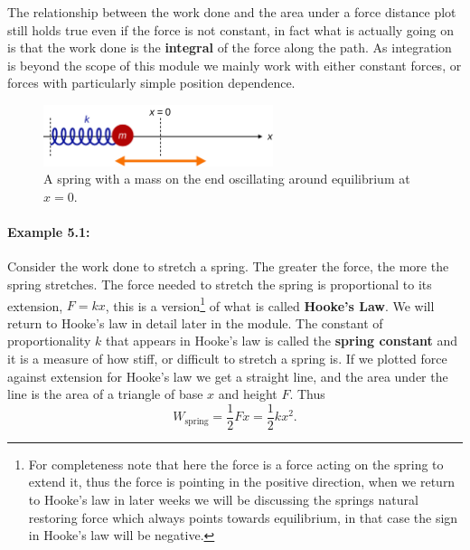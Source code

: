 \documentclass[a4paper,12pt]{book}
\begin{document}
The relationship between the work done and the area under a force distance plot still holds true even if the force is not constant, in fact what is actually going on is that the work done is the \textbf{integral} of the force along the path. As integration is beyond the scope of this module we mainly work with either constant forces, or forces with particularly simple position dependence.

\begin{figure}[ht]
    \centering
    \includegraphics[width=0.6\textwidth]{figures/SHO_lagrangian_mech.png}
    \caption{A spring with a mass on the end oscillating around equilibrium at $x=0$.}
\end{figure}

\paragraph{Example 5.1:} Consider the work done to stretch a spring. The greater the force, the more the spring stretches. The force needed to stretch the spring is proportional to its extension, $F= kx$, this is a version\footnote{For completeness note that here the force is a force acting on the spring to extend it, thus the force is pointing in the positive direction, when we return to Hooke's law in later weeks we will be discussing the springs natural restoring force which always points towards equilibrium, in that case the sign in Hooke's law will be negative.} of what is called \textbf{Hooke's Law}. We will return to Hooke's law in detail later in the module. The constant of proportionality $k$ that appears in Hooke's law is called the \textbf{spring constant} and it is a measure of how stiff, or difficult to stretch a spring is. If we plotted force against extension for Hooke's law we get a straight line, and the area under the line is the area of a triangle of base $x$ and height $F$. Thus
\begin{equation*}
W_{\text{spring}}=\frac{1}{2}F x=\frac{1}{2}k x^{2}.
\end{equation*}
\end{document}

